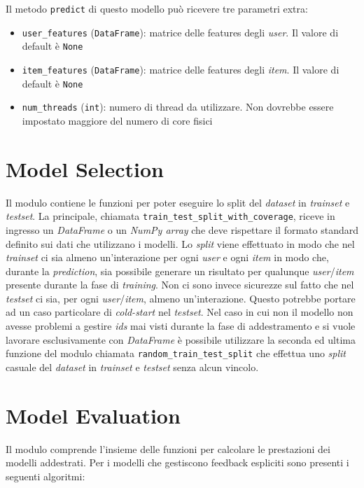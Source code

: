 Il metodo \texttt{predict} di questo modello può ricevere tre parametri extra:

\begin{itemize}
    \item \texttt{user\_features} (\texttt{DataFrame}): matrice delle features degli \textit{user}. Il valore di default è \texttt{None}
    \item \texttt{item\_features} (\texttt{DataFrame}): matrice delle features degli \textit{item}. Il valore di default è \texttt{None}
    \item \texttt{num\_threads} (\texttt{int}): numero di thread da utilizzare. Non dovrebbe essere impostato maggiore del numero di core fisici
\end{itemize}

\section{Model Selection}

Il modulo contiene le funzioni per poter eseguire lo split del \textit{dataset} in \textit{trainset} e \textit{testset}. La principale, chiamata \texttt{train\_test\_split\_with\_coverage}, riceve in ingresso un \textit{DataFrame} o un \textit{NumPy array} che deve rispettare il formato standard definito sui dati che utilizzano i modelli. Lo \textit{split} viene effettuato in modo che nel \textit{trainset} ci sia almeno un'interazione per ogni \textit{user} e ogni \textit{item} in modo che, durante la \textit{prediction}, sia possibile generare un risultato per qualunque \textit{user}/\textit{item} presente durante la fase di \textit{training}. Non ci sono invece sicurezze sul fatto che nel \textit{testset} ci sia, per ogni \textit{user}/\textit{item}, almeno un'interazione. Questo potrebbe portare ad un caso particolare di \textit{cold-start} nel \textit{testset}. Nel caso in cui non il modello non avesse problemi a gestire \textit{ids} mai visti durante la fase di addestramento e si vuole lavorare esclusivamente con \textit{DataFrame} è possibile utilizzare la seconda ed ultima funzione del modulo chiamata \texttt{random\_train\_test\_split} che effettua uno \textit{split} casuale del \textit{dataset} in \textit{trainset} e \textit{testset} senza alcun vincolo.

\section{Model Evaluation}
Il modulo comprende l'insieme delle funzioni per calcolare le prestazioni dei modelli addestrati. Per i modelli che gestiscono feedback espliciti sono presenti i seguenti algoritmi:

